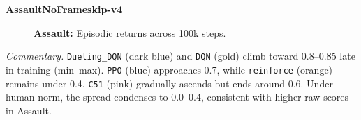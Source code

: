 \noindent
\textbf{AssaultNoFrameskip-v4}
\begin{figure} 
	\centering
	\quad
	\caption{\textbf{Assault:} Episodic returns across 100k steps.}
	\label{fig:assault_comparison_combined}
\end{figure}

\noindent
\emph{Commentary.}
\texttt{Dueling\_DQN} (dark blue) and \texttt{DQN} (gold) climb toward 0.8--0.85 
late in training (min--max). 
\texttt{PPO} (blue) approaches 0.7, while \texttt{reinforce} (orange) remains 
under 0.4. \texttt{C51} (pink) gradually ascends but ends around 0.6. 
Under human norm, the spread condenses to 0.0--0.4, consistent with higher 
raw scores in Assault.

\bigskip

